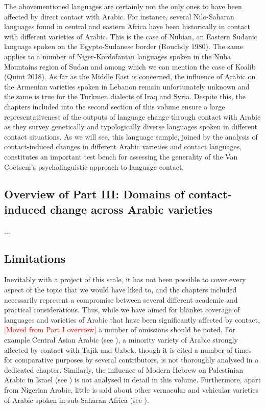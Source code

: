 \documentclass[output=paper]{langsci/langscibook}
\begin{document}
The abovementioned languages are certainly not the only ones to have been affected by direct contact with Arabic. For instance, several Nilo-Saharan languages found in central and eastern Africa have been historically in contact with different varieties of Arabic. This is the case of Nubian, an Eastern Sudanic language spoken on the Egypto-Sudanese border (Rouchdy 1980). The same applies to a number of Niger-Kordofanian languages spoken in the Nuba Mountains region of Sudan and among which we can mention the case of Koalib (Quint 2018). As far as the Middle East is concerned, the influence of Arabic on the Armenian varieties spoken in Lebanon remain unfortunately unknown and the same is true for the Turkmen dialects of Iraq and Syria. Despite this, the chapters included into the second section of this volume ensure a large representativeness of the outputs of language change through contact with Arabic as they survey genetically and typologically diverse languages spoken in different contact situations. As we will see, this language sample, joined by the analysis of contact-induced changes in different Arabic varieties and contact languages, constitutes an important test bench for assessing the generality of the Van Coetsem’s psycholinguistic approach to language contact.

\subsection{Overview of Part III: Domains of contact-induced
change across Arabic varieties}
...

\subsection{Limitations}\label{introlimitations}

Inevitably with a project of this scale, it has not been possible to cover every  aspect of the topic that we would have liked to, and the chapters included necessarily represent a compromise between several different academic and practical considerations. Thus, while we have aimed for blanket coverage of languages and varieties of Arabic that have been significantly affected by contact, \textcolor{red}{[Moved from Part I overview]} a number of omissions should be noted. For example Central Asian Arabic (see \citealt{Seeger2013article}), a minority variety of Arabic strongly affected by contact with Tajik and Uzbek, though it is cited a number of times for comparative purposes by several contributors, is not thoroughly analysed in a dedicated chapter. Similarly, the influence of Modern Hebrew on Palestinian Arabic in Israel (see \citealt{Horesh2015}) is not analysed in detail in this volume. Furthermore, apart from Nigerian Arabic, little is said about other vernacular and vehicular varieties of Arabic spoken in sub-Saharan Africa (see \citealt{Lafkioui2013book}). 
\end{document}
